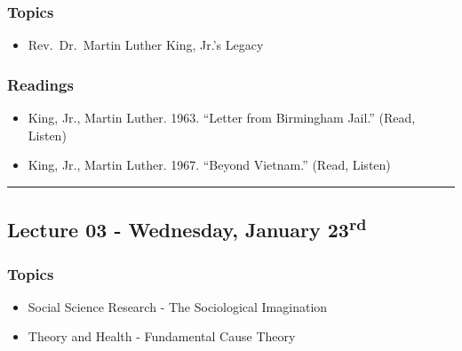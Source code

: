 \documentclass[]{book}
\providecommand{\tightlist}{%
  \setlength{\itemsep}{0pt}\setlength{\parskip}{0pt}}
\begin{document}
\hypertarget{topics-2}{%
\subsubsection*{Topics}\label{topics-2}}

\begin{itemize}
\tightlist
\item
  Rev.~Dr.~Martin Luther King, Jr.'s Legacy
\end{itemize}

\hypertarget{readings-2}{%
\subsubsection*{Readings}\label{readings-2}}

\begin{itemize}
\tightlist
\item
  King, Jr., Martin Luther. 1963. ``Letter from Birmingham Jail.'' (Read, Listen)
\item
  King, Jr., Martin Luther. 1967. ``Beyond Vietnam.'' (Read, Listen)
\end{itemize}

\begin{center}\rule{0.5\linewidth}{\linethickness}\end{center}

\hypertarget{lecture-03---wednesday-january-23rd}{%
\subsection*{\texorpdfstring{Lecture 03 - Wednesday, January 23\textsuperscript{rd}}{Lecture 03 - Wednesday, January 23rd}}\label{lecture-03---wednesday-january-23rd}}

\hypertarget{topics-3}{%
\subsubsection*{Topics}\label{topics-3}}

\begin{itemize}
\tightlist
\item
  Social Science Research - The Sociological Imagination
\item
  Theory and Health - Fundamental Cause Theory
\end{itemize}
\end{document}
